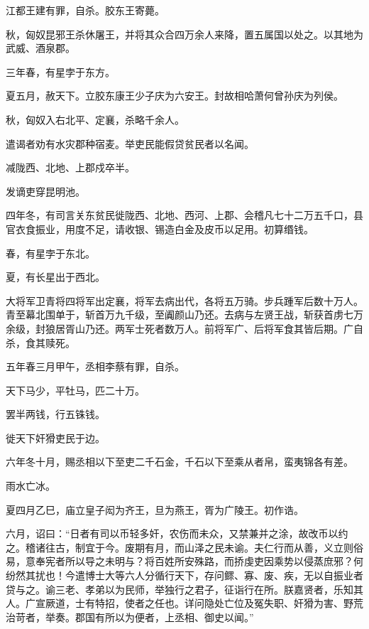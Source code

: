 \documentclass[12pt,UTF8]{ctexbook}
\begin{document}
江都王建有罪，自杀。胶东王寄薨。



秋，匈奴昆邪王杀休屠王，并将其众合四万余人来降，置五属国以处之。以其地为武威、酒泉郡。



三年春，有星孛于东方。



夏五月，赦天下。立胶东康王少子庆为六安王。封故相哈萧何曾孙庆为列侯。



秋，匈奴入右北平、定襄，杀略千余人。



遣谒者劝有水灾郡种宿麦。举吏民能假贷贫民者以名闻。



减陇西、北地、上郡戍卒半。



发谪吏穿昆明池。



四年冬，有司言关东贫民徙陇西、北地、西河、上郡、会稽凡七十二万五千口，县官衣食振业，用度不足，请收银、锡造白金及皮币以足用。初算缗钱。



春，有星孛于东北。



夏，有长星出于西北。



大将军卫青将四将军出定襄，将军去病出代，各将五万骑。步兵踵军后数十万人。青至幕北围单于，斩首万九千级，至阗颜山乃还。去病与左贤王战，斩获首虏七万余级，封狼居胥山乃还。两军士死者数万人。前将军广、后将军食其皆后期。广自杀，食其赎死。



五年春三月甲午，丞相李蔡有罪，自杀。



天下马少，平牡马，匹二十万。



罢半两钱，行五铢钱。



徙天下奸猾吏民于边。



六年冬十月，赐丞相以下至吏二千石金，千石以下至乘从者帛，蛮夷锦各有差。



雨水亡冰。



夏四月乙巳，庙立皇子闳为齐王，旦为燕王，胥为广陵王。初作诰。



六月，诏曰：“日者有司以币轻多奸，农伤而未众，又禁兼并之涂，故改币以约之。稽诸往古，制宜于今。废期有月，而山泽之民未谕。夫仁行而从善，义立则俗易，意奉宪者所以导之未明与？将百姓所安殊路，而挢虔吏因乘势以侵蒸庶邪？何纷然其扰也！今遣博士大等六人分循行天下，存问鳏、寡、废、疾，无以自振业者贷与之。谕三老、孝弟以为民师，举独行之君子，征诣行在所。朕嘉贤者，乐知其人。广宣厥道，士有特招，使者之任也。详问隐处亡位及冤失职、奸猾为害、野荒治苛者，举奏。郡国有所以为便者，上丞相、御史以闻。”
\end{document}
